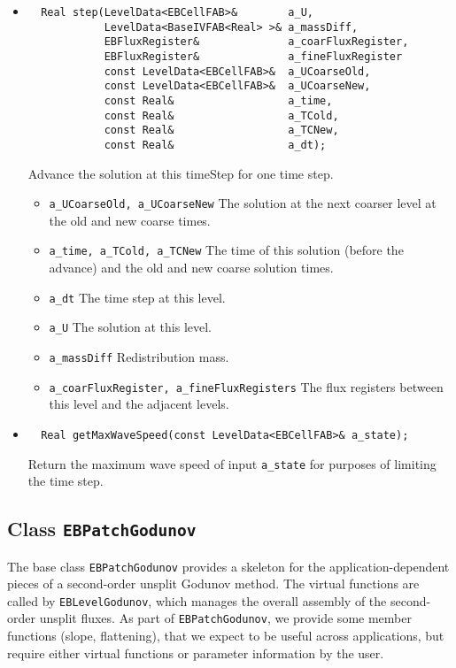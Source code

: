 \begin{itemize}
\item \begin{small} \begin{verbatim}
  Real step(LevelData<EBCellFAB>&        a_U,
            LevelData<BaseIVFAB<Real> >& a_massDiff,
            EBFluxRegister&              a_coarFluxRegister,
            EBFluxRegister&              a_fineFluxRegister
            const LevelData<EBCellFAB>&  a_UCoarseOld,
            const LevelData<EBCellFAB>&  a_UCoarseNew,
            const Real&                  a_time,
            const Real&                  a_TCold,
            const Real&                  a_TCNew,
            const Real&                  a_dt);
\end{verbatim}\end{small}
Advance the solution at this timeStep for one time step.
\begin{itemize}
\item\verb/a_UCoarseOld, a_UCoarseNew/ The solution at the
next coarser level at the old and new coarse times.
\item\verb/a_time, a_TCold, a_TCNew/
The time of this solution (before the advance) and
the old and new coarse solution times.
\item \verb/a_dt/ The time step at this level.
\item \verb/a_U/  The solution at this level.
\item \verb/a_massDiff/  Redistribution mass.
\item \verb/a_coarFluxRegister, a_fineFluxRegisters/  The flux
registers between this level and the adjacent levels. 
\end{itemize}

\item \begin{small} \begin{verbatim}
  Real getMaxWaveSpeed(const LevelData<EBCellFAB>& a_state);
\end{verbatim}\end{small}
Return the maximum wave speed of input \verb/a_state/  for purposes
of limiting the time step.
\end{itemize}

\subsection{Class {\tt EBPatchGodunov}}
The base class {\tt EBPatchGodunov} provides a skeleton for the
application-dependent pieces of a second-order unsplit Godunov method.
The virtual functions are called by {\tt EBLevelGodunov}, which manages
the overall assembly of the second-order unsplit fluxes. 
As part of {\tt EBPatchGodunov}, we provide some member functions 
(slope, flattening), that we expect to be useful across applications,
but require either virtual functions or parameter information by the
user.


